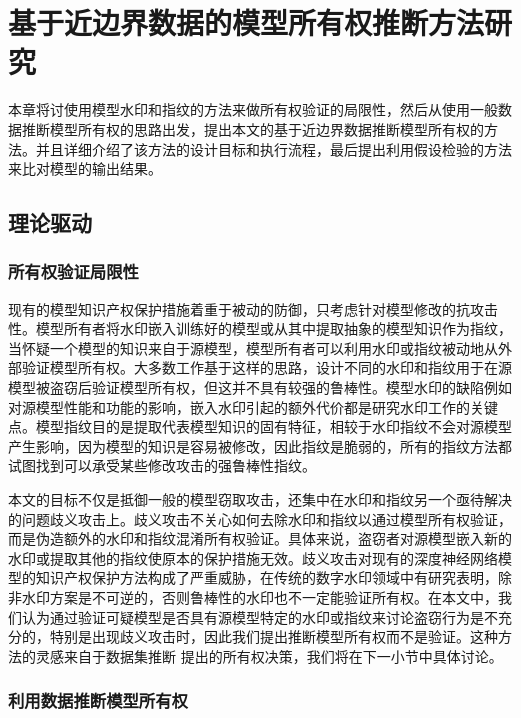 
\chapter{基于近边界数据的模型所有权推断方法研究}\label{4}

本章将讨使用模型水印和指纹的方法来做所有权验证的局限性，然后从使用一般数据推断模型所有权的思路出发，提出本文的基于近边界数据推断模型所有权的方法。并且详细介绍了该方法的设计目标和执行流程，最后提出利用假设检验的方法来比对模型的输出结果。

\section{理论驱动}\label{4.1}

\subsection{所有权验证局限性}

现有的模型知识产权保护措施着重于被动的防御，只考虑针对模型修改的抗攻击性。模型所有者将水印嵌入训练好的模型或从其中提取抽象的模型知识作为指纹，当怀疑一个模型的知识来自于源模型，模型所有者可以利用水印或指纹被动地从外部验证模型所有权。大多数工作基于这样的思路，设计不同的水印和指纹用于在源模型被盗窃后验证模型所有权，但这并不具有较强的鲁棒性。模型水印的缺陷例如对源模型性能和功能的影响，嵌入水印引起的额外代价都是研究水印工作的关键点。模型指纹目的是提取代表模型知识的固有特征，相较于水印指纹不会对源模型产生影响，因为模型的知识是容易被修改，因此指纹是脆弱的，所有的指纹方法都试图找到可以承受某些修改攻击的强鲁棒性指纹。

本文的目标不仅是抵御一般的模型窃取攻击，还集中在水印和指纹另一个亟待解决的问题歧义攻击上。歧义攻击不关心如何去除水印和指纹以通过模型所有权验证，而是伪造额外的水印和指纹混淆所有权验证。具体来说，盗窃者对源模型嵌入新的水印或提取其他的指纹使原本的保护措施无效。歧义攻击对现有的深度神经网络模型的知识产权保护方法构成了严重威胁，在传统的数字水印领域中有研究表明，除非水印方案是不可逆的\cite{fan2019rethinking}，否则鲁棒性的水印也不一定能验证所有权。在本文中，我们认为通过验证可疑模型是否具有源模型特定的水印或指纹来讨论盗窃行为是不充分的，特别是出现歧义攻击时，因此我们提出推断模型所有权而不是验证。这种方法的灵感来自于数据集推断\cite{maini2021dataset} 提出的所有权决策，我们将在下一小节中具体讨论。

\subsection{利用数据推断模型所有权}\label{4.1.2}

